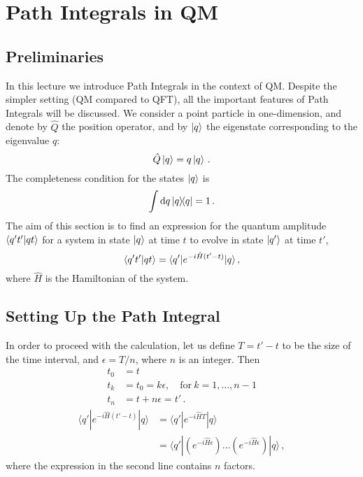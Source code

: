 \documentclass[notes]{subfiles}
\begin{document}
\chapter{Path Integrals in QM}
\label{chap:lec1}

\newcommand{\epsstep}{\left(e^{-i \hat{H} \epsilon}\right)}


\section{Preliminaries}
\label{sec:preliminaries-1}

In this lecture we introduce Path Integrals in the context of
QM. Despite the simpler setting (QM compared to QFT), all the
important features of Path Integrals will be discussed. We consider a
point particle in one-dimension, and denote by $\hat{Q}$ the position
operator, and by $\ket{q}$ the eigenstate corresponding to the eigenvalue
$q$:
\begin{equation}
  \label{eq:QEigen}
  \hat{Q} \ket{q} = q \ket{q}\, .
\end{equation}
The completeness condition for the states $\ket{q}$ is
\begin{equation}
  \label{eq:qComplete}
  \int \dd{q}\ketbra{q}{q} = 1\, .
\end{equation}
The aim of this section is to find an expression for the quantum
amplitude $\braket{q't'}{qt}$ for a system in state $\ket{q}$ at time
$t$ to evolve in state $\ket{q'}$ at time $t'$,
\begin{equation}
  \label{eq:AmplitudeDef}
  \braket{q't'}{qt} = \langle q' | e^{-i \hat{H} (t'-t)}|q\rangle\, ,
\end{equation}
where $\hat{H}$ is the Hamiltonian of the system. 

\section{Setting Up the Path Integral}
\label{sec:setting-up-path}

In order to proceed with the calculation, let us define $T=t'-t$ to be
the size of the time interval, and $\epsilon=T/n$, where $n$ is an
integer. Then 
\begin{align}
  t_0 &= t \\
  t_k &= t_0 = k \epsilon, \quad \text{for}\ k=1, \ldots, n-1 \\
  t_n &= t + n \epsilon = t'\, .
\end{align}
\begin{align}
  \langle q' | e^{-i \hat{H} (t'-t)}|q\rangle &= 
                 \langle q' | e^{-i \hat{H} T} | q\rangle \\
               &= \langle q' | \left(e^{-i \hat{H} \epsilon}\right)
                 \ldots \left(e^{-i \hat{H} \epsilon}\right) |
                 q\rangle\, ,
\end{align}
where the expression in the second line contains $n$ factors. 
\end{document}
